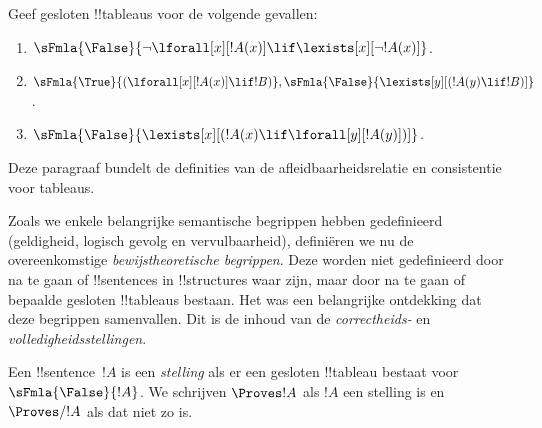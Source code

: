 \documentclass[openany]{memoir}
\begin{document}
\begin{prob}
Geef gesloten !!{tableau}s voor de volgende gevallen:
\begin{enumerate}
\item $\sFmla{\False}{\lnot\lforall[x][!A(x)] \lif \lexists[x][\lnot!A(x)]}$.
\item $\sFmla{\True}{(\lforall[x][!A(x)] \lif !B)}, \sFmla{\False}{\lexists[y][(!A(y) \lif !B)]}$.
\item $\sFmla{\False}{\lexists[x][(!A(x) \lif \lforall[y][!A(y)])]}$.
\end{enumerate}
\end{prob}
\endgroup

\begingroup
\def\olfilename{OLP-0105}
\def\olfilepath{content/first-order-logic/tableaux/}
\hypertarget{unit-OLP-0105}{}



      {}
      {}
      

\begin{editorial}
Deze paragraaf bundelt de definities van de afleidbaarheidsrelatie
en consistentie voor tableaus.
\end{editorial}

\begin{explain}
Zoals we enkele belangrijke semantische begrippen hebben gedefinieerd
(geldigheid, logisch gevolg en vervulbaarheid), definiëren we nu de
overeenkomstige \emph{bewijstheoretische begrippen}. Deze worden niet
gedefinieerd door na te gaan of !!{sentence}s in !!{structure}s waar
zijn, maar door na te gaan of bepaalde gesloten !!{tableau}s bestaan.
Het was een belangrijke ontdekking dat deze begrippen samenvallen. Dit
is de inhoud van de \emph{correctheids-} en
\emph{volledigheidsstellingen}.
\end{explain}


\begin{defn}[Stellingen]
Een !!{sentence}~$!A$ is een \emph{stelling} als er een gesloten
!!{tableau} bestaat voor~$\sFmla{\False}{!A}$. We schrijven
$\Proves !A$ als $!A$ een stelling is en $\Proves/ !A$ als dat niet
zo is.
\end{defn}
\end{document}

